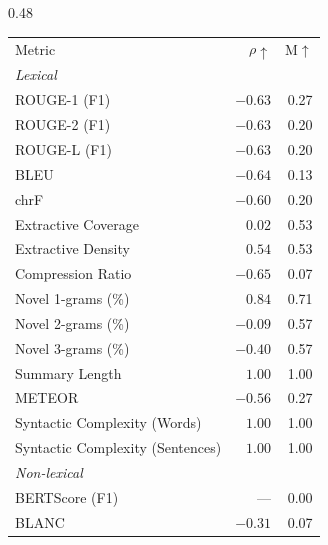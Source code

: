 \begin{table}[htbp]
\centering
\footnotesize
\setlength{\tabcolsep}{4pt}
\begin{subtable}[t]{0.48\textwidth}
\centering
\begin{tabular}{lrr}
 & & \\
\toprule
Metric & $\rho\uparrow$ & M$\uparrow$ \\
\midrule
\multicolumn{3}{l}{\textit{Lexical}} \\
\midrule
\rowcolor{matchFalse} ROUGE-1 (F1)                          &  $-0.63$ &  0.27 \\
\rowcolor{matchFalse} ROUGE-2 (F1)                          &  $-0.63$ &  0.20 \\
\rowcolor{matchFalse} ROUGE-L (F1)                          &  $-0.63$ &  0.20 \\
\rowcolor{matchFalse} BLEU                                  &  $-0.64$ &  0.13 \\
\rowcolor{matchFalse} chrF                                  &  $-0.60$ &  0.20 \\
\rowcolor{matchFalse} Extractive Coverage                   &   $0.02$ &  0.53 \\
\rowcolor{matchTrue} Extractive Density                    &   $0.54$ &  0.53 \\
\rowcolor{matchFalse} Compression Ratio                     &  $-0.65$ &  0.07 \\
\rowcolor{matchTrue} Novel 1-grams (\%)                    &   $0.84$ &  0.71 \\
\rowcolor{matchFalse} Novel 2-grams (\%)                    &  $-0.09$ &  0.57 \\
\rowcolor{matchFalse} Novel 3-grams (\%)                    &  $-0.40$ &  0.57 \\
\rowcolor{matchTrue} Summary Length                        &   $1.00$ &  1.00 \\
\rowcolor{matchFalse} METEOR                                &  $-0.56$ &  0.27 \\
\rowcolor{matchTrue} Syntactic Complexity (Words)          &   $1.00$ &  1.00 \\
\rowcolor{matchTrue} Syntactic Complexity (Sentences)      &   $1.00$ &  1.00 \\
\midrule
\multicolumn{3}{l}{\textit{Non-lexical}} \\
\midrule
\rowcolor{matchFalse} BERTScore (F1)                        &      --- &  0.00 \\
\rowcolor{matchFalse} BLANC                                 &  $-0.31$ &  0.07 \\

\end{tabular}
\end{subtable}
\end{table}
